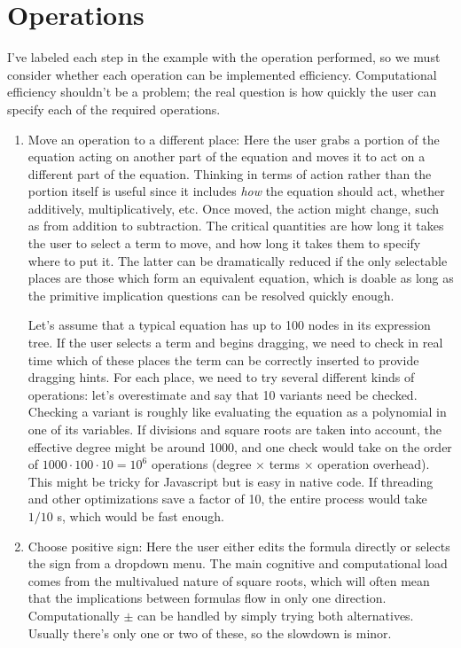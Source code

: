 \documentclass[11pt]{article}
\newcommand{\blue}[1]{{\color{blue} #1}}
\begin{document}
\section{Operations}

I've labeled each step in the example with the operation performed, so we must consider whether each operation
can be implemented efficiency.  Computational efficiency shouldn't be a problem; the real question is how quickly
the user can specify each of the required operations.

\begin{enumerate}
\item \blue{Move an operation to a different place:} Here the user grabs a portion of the equation
acting on another part of the equation and moves it to act on a different part of the equation.  Thinking in
terms of action rather than the portion itself is useful since it includes \emph{how} the equation should
act, whether additively, multiplicatively, etc.  Once moved, the action might change, such as from
addition to subtraction.  The critical quantities are how long it takes the user to select a term to move,
and how long it takes them to specify where to put it.  The latter can be dramatically reduced if the only
selectable places are those which form an equivalent equation, which is doable as long as the primitive
implication questions can be resolved quickly enough.

Let's assume that a typical equation has up to 100 nodes in its expression tree.  If the user
selects a term and begins dragging, we need to check in real time which of these places the term can be
correctly inserted to provide dragging hints.  For each place, we need to try several different kinds of
operations: let's overestimate and say that 10 variants need be checked.  Checking a variant is roughly
like evaluating the equation as a polynomial in one of its variables.  If divisions and square roots are
taken into account, the effective degree might be around 1000, and one check would take on the 
order of $1000 \cdot 100 \cdot 10 = 10^6$ operations (degree $\times$ terms $\times$ operation overhead).  This
might be tricky for Javascript but is easy in native code.  If threading and other optimizations save a
factor of 10, the entire process would take $1/10$ s, which would be fast enough.

\item \blue{Choose positive sign:} Here the user either edits the formula directly or selects the sign
from a dropdown menu.  The main cognitive and computational load comes from the multivalued nature of
square roots, which will often mean that the implications between formulas flow in only one direction.
Computationally $\pm$ can be handled by simply trying both alternatives.  Usually there's only one or two
of these, so the slowdown is minor.


\end{enumerate}
\end{document}
